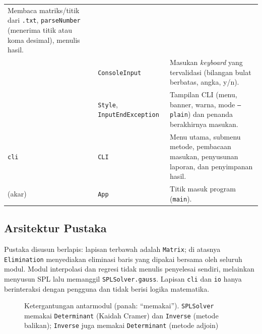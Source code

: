 \documentclass[12pt,a4paper]{article}
\begin{document}
{\begin{longtable}{@{}p{2.7cm}p{3.3cm}p{8.2cm}@{}}
 Membaca matriks/titik dari \texttt{.txt}, \texttt{parseNumber} (menerima titik atau koma desimal), menulis hasil.\\
 & \texttt{ConsoleInput} &
 Masukan \textit{keyboard} yang tervalidasi (bilangan bulat berbatas, angka, y/n).\\
 & \texttt{Style}, \texttt{InputEnd\-Exception} &
 Tampilan CLI (menu, banner, warna, mode \texttt{--plain}) dan penanda berakhirnya masukan.\\
\texttt{cli} & \texttt{CLI} &
 Menu utama, submenu metode, pembacaan masukan, penyusunan laporan, dan penyimpanan hasil.\\
(akar) & \texttt{App} & Titik masuk program (\texttt{main}).\\
\bottomrule
\end{longtable}}

\subsection{Arsitektur Pustaka}
Pustaka disusun berlapis: lapisan terbawah adalah \texttt{Matrix}; di atasnya \texttt{Elimination} menyediakan eliminasi baris yang dipakai bersama oleh seluruh modul. Modul interpolasi dan regresi tidak menulis penyelesai sendiri, melainkan menyusun SPL lalu memanggil \texttt{SPLSolver.gauss}. Lapisan \texttt{cli} dan \texttt{io} hanya berinteraksi dengan pengguna dan tidak berisi logika matematika.

\begin{figure}[H]
\centering
{}
\caption{Ketergantungan antarmodul (panah: ``memakai''). \texttt{SPLSolver} memakai \texttt{Determinant} (Kaidah Cramer) dan \texttt{Inverse} (metode balikan); \texttt{Inverse} juga memakai \texttt{Determinant} (metode adjoin)}
\end{figure}
\end{document}
